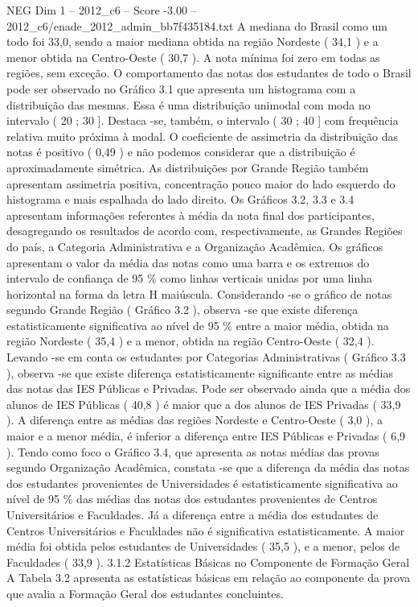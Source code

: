 \begin{textsample}{NEG Dim 1 – 2012\_c6 – Score -3.00 – 2012\_c6/enade\_2012\_admin\_bb7f435184.txt}
A mediana do Brasil como um todo foi 33,0, sendo a maior mediana obtida na região Nordeste ( 34,1 ) e a menor obtida na Centro-Oeste ( 30,7 ).
A nota mínima foi zero em todas as regiões, sem exceção.
O comportamento das notas dos estudantes de todo o Brasil pode ser observado no Gráfico 3.1 que apresenta um histograma com a distribuição das mesmas.
Essa é uma distribuição unimodal com moda no intervalo ( 20 ; 30 ].
Destaca -se, também, o intervalo ( 30 ; 40 ] com frequência relativa muito próxima à modal.
O coeficiente de assimetria da distribuição das notas é positivo ( 0,49 ) e não podemos considerar que a distribuição é aproximadamente simétrica.
As distribuições por Grande Região também apresentam assimetria positiva, concentração pouco maior do lado esquerdo do histograma e mais espalhada do lado direito.
Os Gráficos 3.2, 3.3 e 3.4 apresentam informações referentes à média da nota final dos participantes, desagregando os resultados de acordo com, respectivamente, as Grandes Regiões do país, a Categoria Administrativa e a Organização Acadêmica.
Os gráficos apresentam o valor da média das notas como uma barra e os extremos do intervalo de confiança de 95 \% como linhas verticais unidas por uma linha horizontal na forma da letra H maiúscula.
Considerando -se o gráfico de notas segundo Grande Região ( Gráfico 3.2 ), observa -se que existe diferença estatisticamente significativa ao nível de 95 \% entre a maior média, obtida na região Nordeste ( 35,4 ) e a menor, obtida na região Centro-Oeste ( 32,4 ).
Levando -se em conta os estudantes por Categorias Administrativas ( Gráfico 3.3 ), observa -se que existe diferença estatisticamente significante entre as médias das notas das IES Públicas e Privadas.
Pode ser observado ainda que a média dos alunos de IES Públicas ( 40,8 ) é maior que a dos alunos de IES Privadas ( 33,9 ).
A diferença entre as médias das regiões Nordeste e Centro-Oeste ( 3,0 ), a maior e a menor média, é inferior a diferença entre IES Públicas e Privadas ( 6,9 ).
Tendo como foco o Gráfico 3.4, que apresenta as notas médias das provas segundo Organização Acadêmica, constata -se que a diferença da média das notas dos estudantes provenientes de Universidades é estatisticamente significativa ao nível de 95 \% das médias das notas dos estudantes provenientes de Centros Universitários e Faculdades.
Já a diferença entre a média dos estudantes de Centros Universitários e Faculdades não é significativa estatisticamente.
A maior média foi obtida pelos estudantes de Universidades ( 35,5 ), e a menor, pelos de Faculdades ( 33,9 ). 3.1.2 Estatísticas Básicas no Componente de Formação Geral A Tabela 3.2 apresenta as estatísticas básicas em relação ao componente da prova que avalia a Formação Geral dos estudantes concluintes.

\end{textsample}
